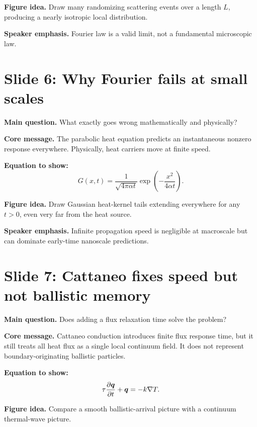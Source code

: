 \documentclass[11pt]{article}
\begin{document}
\textbf{Figure idea.} Draw many randomizing scattering events over a length \(L\), producing a nearly isotropic local distribution.

\textbf{Speaker emphasis.} Fourier law is a valid limit, not a fundamental microscopic law.

\section{Slide 6: Why Fourier fails at small scales}
\begin{physicsbox}
\textbf{Main question.} What exactly goes wrong mathematically and physically?
\end{physicsbox}

\textbf{Core message.} The parabolic heat equation predicts an instantaneous nonzero response everywhere. Physically, heat carriers move at finite speed.

\textbf{Equation to show:}
\begin{equation*}
G(x,t)=\frac{1}{\sqrt{4\pi\alpha t}}\exp\left(-\frac{x^2}{4\alpha t}\right).
\end{equation*}

\textbf{Figure idea.} Draw Gaussian heat-kernel tails extending everywhere for any \(t>0\), even very far from the heat source.

\textbf{Speaker emphasis.} Infinite propagation speed is negligible at macroscale but can dominate early-time nanoscale predictions.

\section{Slide 7: Cattaneo fixes speed but not ballistic memory}
\begin{physicsbox}
\textbf{Main question.} Does adding a flux relaxation time solve the problem?
\end{physicsbox}

\textbf{Core message.} Cattaneo conduction introduces finite flux response time, but it still treats all heat flux as a single local continuum field. It does not represent boundary-originating ballistic particles.

\textbf{Equation to show:}
\begin{equation*}
\tau\frac{\partial \bm{q}}{\partial t}+\bm{q}=-k\nabla T.
\end{equation*}

\textbf{Figure idea.} Compare a smooth ballistic-arrival picture with a continuum thermal-wave picture.
\end{document}
